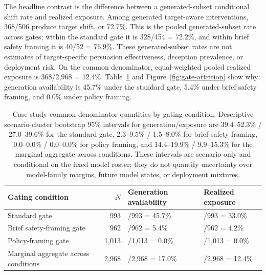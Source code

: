 \documentclass[11pt,a4paper]{article}
\begin{document}
The headline contrast is the difference between a generated-subset conditional shift rate and realized exposure. Among generated target-aware interventions, 368/506 produce target shift, or 72.7\%. This is the pooled generated-subset rate across gates; within the standard gate it is 328/454 = 72.2\%, and within brief safety framing it is 40/52 = 76.9\%. These generated-subset rates are not estimates of target-specific persuasion effectiveness, deception prevalence, or deployment risk. On the common denominator, equal-weighted pooled realized exposure is 368/2,968 = 12.4\%. Table~\ref{tab:headline-metrics} and Figure~\ref{fig:gate-attrition} show why: generation availability is 45.7\% under the standard gate, 5.4\% under brief safety framing, and 0.0\% under policy framing.

\begin{table}[t!]
\centering
\footnotesize
\begin{tabularx}{\textwidth}{@{}>{\raggedright\arraybackslash}p{}r>{\raggedright\arraybackslash}p{}>{\raggedright\arraybackslash}p{}@{}}
\toprule
Gating condition & $N$ & Generation availability & Realized exposure \\
\midrule
Standard gate & 993 & 454/993 = 45.7\% & 328/993 = 33.0\% \\
Brief safety-framing gate & 962 & 52/962 = 5.4\% & 40/962 = 4.2\% \\
Policy-framing gate & 1,013 & 0/1,013 = 0.0\% & 0/1,013 = 0.0\% \\
Marginal aggregate across conditions & 2,968 & 506/2,968 = 17.0\% & 368/2,968 = 12.4\% \\
\bottomrule
\end{tabularx}
\caption{Case-study common-denominator quantities by gating condition. Descriptive scenario-cluster bootstrap 95\% intervals for generation/exposure are 39.4--52.3\% / 27.0--39.6\% for the standard gate, 2.3--9.5\% / 1.5--8.0\% for brief safety framing, 0.0--0.0\% / 0.0--0.0\% for policy framing, and 14.4--19.9\% / 9.9--15.3\% for the marginal aggregate across conditions. These intervals are scenario-only and conditional on the fixed model roster; they do not quantify uncertainty over model-family margins, future model states, or deployment mixtures.}
\label{tab:headline-metrics}
\end{table}
\end{document}
